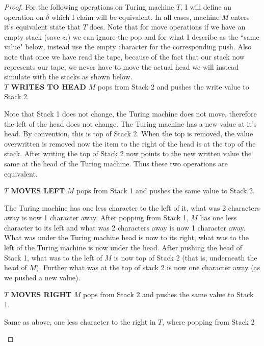 \documentclass[12pt]{jhwhw}
\begin{document}
\begin{proof}
		For the following operations on Turing machine $T$, I will define an operation on $\delta$ which
		I claim will be equivalent. In all cases, machine $M$ enters it's equivalent state that $T$ does. 
		Note that for move operations if we have an empty stack (save $z_i$) we can ignore the pop
		and for what I describe as the ``same value" below, instead use the empty character for the
		corresponding push. Also note that once we have read the tape, because of the
		fact that our stack now represents our tape, we never have to move the actual head we 
		will instead simulate with the stacks as shown below. \\
		\bigbreak
		\textbf{$T$ WRITES TO HEAD} $M$ pops from Stack 2 and pushes the write value to Stack 2. \\
		\begin{addmargin}{1em}
			Note that Stack 1 does not change, the Turing machine does not move, therefore
			the left of the head does not change. The Turing machine has a new value at it's head.
			By convention, this is top of Stack 2. When the top is removed, the value overwritten
			is removed now the item to the right of the head is at the top of the stack. After
			writing the top of Stack 2 now points to the new written value the same at the 
			head of the Turing machine. Thus these two operations are equivalent.
		\end{addmargin}
		\textbf{$T$ MOVES LEFT} $M$ pops from Stack 1 and pushes the same value to Stack 2. \\
		\begin{addmargin}{1em}
			The Turing machine has one less character to the left of it, what was 2 characters away
			is now 1 character away. After popping from Stack 1, $M$ has one less character to its left
			and what was 2 characters away is now 1 character away. \\
			What was under the Turing machine head is now to its right, what was to the left of the Turing
			machine is now under the head. After pushing the head of Stack 1, what was to the left of
			$M$ is now top of Stack 2 (that is, underneath the head of $M$). Further what was at the top
			of stack 2 is now one character away (as we pushed a new value).
		\end{addmargin}
		\textbf{$T$ MOVES RIGHT} $M$ pops from Stack 2 and pushes the same value to Stack 1. \\
		\begin{addmargin}{1em}
			Same as above, one less character to the right in $T$, where popping from Stack 2

\end{addmargin}
\end{proof}
\end{document}
